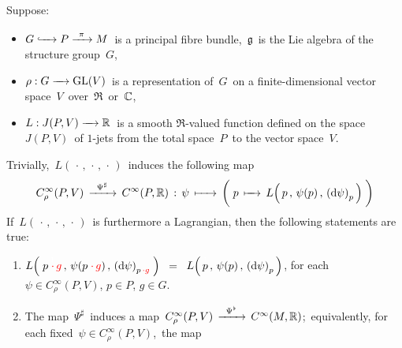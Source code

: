\vskip 0.5cm
\begin{theorem}
\label{LagrangianDescendsToBaseManifold}
\mbox{}
\vskip 0.05cm
\noindent
Suppose:
\begin{itemize}
\item
    \vskip -0.3cm
    $G \xhookrightarrow{{\color{white}222}} P \xrightarrow{{\color{white}2}\pi{\color{white}2}} M$\,
    is a principal fibre bundle, \,$\mathfrak{g}$\, is the Lie algebra of the structure group \,$G$,\,
\item
    $\rho : G \xrightarrow{{\color{white}....}}\GL(V)$\,
    is a representation of \,$G$\,
    on a finite-dimensional vector space \,$V$\, over \,$\Re$\, or \,$\mathbb{C}$,\,
\item
    $L : J(P,V) \xrightarrow{{\color{white}....}} \Re$\,
    is a smooth $\Re$-valued function defined on the space \,$J(P,V)$\, of $1$-jets
    from the total space \,$P$\, to the vector space \,$V$.\,
\end{itemize}
Trivially, \,$L(\,\cdot\,,\,\cdot\,,\,\cdot\,)$\,
induces the following map
\begin{equation*}
C^{\infty}_{\rho}(P,V) \,\xrightarrow{{\color{white}..}\Psi^{\sharp}{\color{white}..}}\, C^{\infty}(P,\Re) \,:\,
\psi \,\xmapsto{{\color{white}......}}\,
    \left(\;\overset{{\color{white}.}}{
        p
        \,\xmapsto{{\color{white}....}}\,
        L\!\left(\,
            \overset{{\color{white}.}}{p}
            \,,\,
            \psi(p)
            \,,\,
            \left(\d\psi\right)_{p}
            \,\right)
        }\;\right)
\end{equation*}
If \,$L(\,\cdot\,,\,\cdot\,,\,\cdot\,)$\, is furthermore a Lagrangian,
then the following statements are true:
\begin{enumerate}
\item
	$
    L\!\left(\;
        \overset{{\color{white}1}}{p{\color{red}\;\cdot\,g}}
        \,,\,
        \psi(p{\color{red}\;\cdot\,g})
        \,,\,
        \left(\d\psi\right)_{p{\color{red}\,\cdot g}}
        \;\right)
	\;\; = \;\;
		L\!\left(\,
	        \overset{{\color{white}1}}{p}
	        \,,\,
	        \psi(p)
	        \,,\,
	        \left(\d\psi\right)_{p}
	        \,\right)
	$,\;
    for each \;$\psi \in C^{\infty}_{\rho}(P,V)$,\; $p \in P$,\; $g \in G$.\,
\item
    The map \,$\Psi^{\sharp}$\, induces a map
    \,$
    C^{\infty}_{\rho}(P,V) \,\xrightarrow{{\color{white}..}\Psi^{\flat}{\color{white}..}}\, C^{\infty}(M,\Re)
    $;\,
    equivalently,
    for each fixed \,$\psi \in C^{\infty}_{\rho}(P,V)$,\, the map

\end{enumerate}
\end{theorem}
